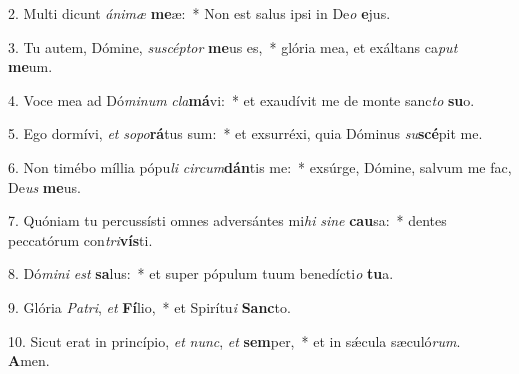 2. Multi dicunt \textit{á}\textit{ni}\textit{mæ} \textbf{me}æ:~*  Non est salus ipsi in De\textit{o} \textbf{e}jus.\

3. Tu autem, Dómine, \textit{su}\textit{scép}\textit{tor} \textbf{me}us es,~*  glória mea, et exáltans ca\textit{put} \textbf{me}um.\

4. Voce mea ad Dó\textit{mi}\textit{num} \textit{cla}\textbf{má}vi:~*  et exaudívit me de monte sanc\textit{to} \textbf{su}o.\

5. Ego dormívi, \textit{et} \textit{so}\textit{po}\textbf{rá}tus sum:~*  et exsurréxi, quia Dóminus \textit{su}\textbf{scé}pit me.\

6. Non timébo míllia pópu\textit{li} \textit{cir}\textit{cum}\textbf{dán}tis me:~*  exsúrge, Dómine, salvum me fac, De\textit{us} \textbf{me}us.\

7. Quóniam tu percussísti omnes adversántes mi\textit{hi} \textit{si}\textit{ne} \textbf{cau}sa:~*  dentes peccatórum con\textit{tri}\textbf{vís}ti.\

8. Dó\textit{mi}\textit{ni} \textit{est} \textbf{sa}lus:~*  et super pópulum tuum benedícti\textit{o} \textbf{tu}a.\

9. Glória \textit{Pa}\textit{tri}, \textit{et} \textbf{Fí}lio,~*  et Spirítu\textit{i} \textbf{Sanc}to.\

10. Sicut erat in princípio, \textit{et} \textit{nunc}, \textit{et} \textbf{sem}per,~*  et in sǽcula sæculó\textit{rum}. \textbf{A}men.\

